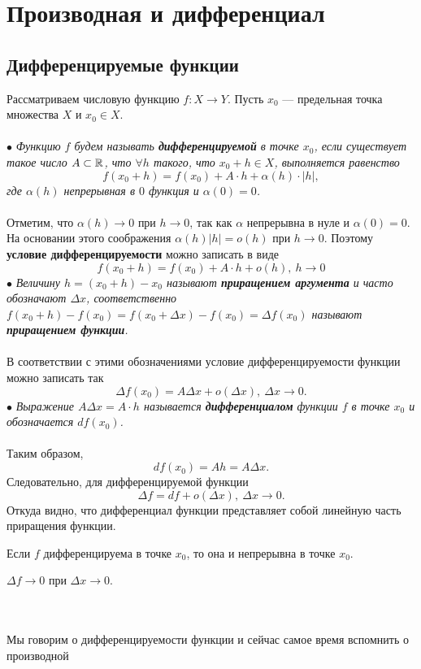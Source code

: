 \chapter{Производная и дифференциал}
\section{Дифференцируемые функции}
Рассматриваем числовую функцию $f:X\to Y$. Пусть $x_0$ --- предельная точка множества $X$ и $x_0\in X$.\\\\
$\bullet$ \textit{Функцию $f$ будем называть \textbf{дифференцируемой} в точке $x_0$, если существует такое число $A\subset\mathbb{R}$, что $\forall h$ такого, что $x_0+h\in X$, выполняется равенство$$f(x_0+h)=f(x_0)+A\cdot h+\alpha(h)\cdot |h|,$$ где $\alpha(h)$ непрерывная в $0$ функция  и $\alpha(0)=0$.}\\\\
Отметим, что $\alpha (h)\to 0$ при $h\to 0$, так как $\alpha$ непрерывна в нуле и $\alpha(0)=0$. На основании этого соображения $\alpha(h)|h|=o(h)$ при $h\to 0$.
Поэтому \textbf{условие дифференцируемости} можно записать в виде
$$f(x_0+h)=f(x_0)+A\cdot h+o(h),\ h\to 0$$
$\bullet$ \textit{Величину $h=(x_0+h)-x_0$ называют \textbf{приращением аргумента} и часто обозначают $\Delta x$, соответственно $f(x_0+h)-f(x_0)=f(x_0+\Delta x)-f(x_0)=\Delta f(x_0)$ называют \textbf{приращением функции}.}\\\\
В соответствии с этими обозначениями условие дифференцируемости функции можно записать так $$\Delta f(x_0)=A \Delta x+o(\Delta x),\ \Delta x\to 0.$$
$\bullet$ \textit{Выражение $A\Delta x=A\cdot h$ называется \textbf{дифференциалом} функции $f$ в точке $x_0$ и обозначается $d f(x_0)$.}\\\\
Таким образом, $$d f(x_0)=A h=A\Delta x.$$
Следовательно, для дифференцируемой функции $$\Delta f=d f +o(\Delta x),\ \Delta x\to 0.$$
Откуда видно, что дифференциал функции представляет собой линейную часть приращения функции.
\begin{theorem}
	Если $f$ дифференцируема в точке $x_0$, то она и непрерывна в точке $x_0$.
\end{theorem}
\begin{Proof}
	$\Delta f\to 0$ при $\Delta x\to 0$.
\end{Proof}\\\\
Мы говорим о дифференцируемости функции и сейчас самое время вспомнить о производной\\\\
